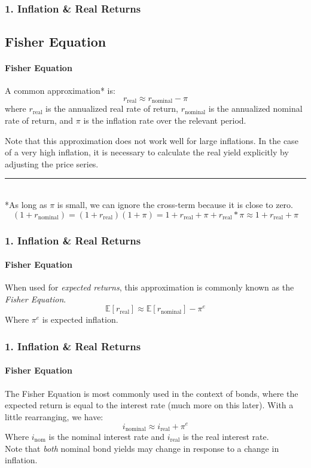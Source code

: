 \documentclass{beamer}
\begin{document}
\begin{frame}[t]
    \frametitle{1. Inflation \& Real Returns}
    \subsection{Fisher Equation}
    \framesubtitle{Fisher Equation}
    A common approximation* is:
    $$r_\text{real} \approx r_{\text{nominal}} - \pi$$
    where $r_\text{real}$ is the annualized real rate of return, 
    $r_{\text{nominal}}$ is the annualized nominal rate of return, 
    and $\pi$ is the inflation rate over the relevant period.\\
    \vspace{1em}

    Note that this approximation does not work well for large inflations.   In the case of a very high inflation, it is necessary to calculate the real yield explicitly by adjusting the price series.
    
    \vfill
    \footnotesize
    \rule{2in}{0.4pt}\\
    *As long as $\pi$ is small, we can ignore the cross-term because it is close to zero.
    $$(1 + r_{\text{nominal}}) = (1+r_\text{real})(1 + \pi) = 1 + r_\text{real} + \pi + r_\text{real}*\pi \approx 1 + r_\text{real} + \pi$$
    

\end{frame}

\begin{frame}[t]
    \frametitle{1. Inflation \& Real Returns}
    \framesubtitle{Fisher Equation}

    When used for \textit{expected returns}, this approximation is commonly known as the \textit{Fisher Equation}.\\
    $$\mathbb{E}[r_\text{real}] \approx \mathbb{E}[r_{\text{nominal}}] - \pi^e$$
    Where $\pi^e$ is expected inflation.\\
    \vspace{1em}

\end{frame}

\begin{frame}[t]
    \frametitle{1. Inflation \& Real Returns}
    \framesubtitle{Fisher Equation}

    The Fisher Equation is most commonly used in the context of bonds, where the expected return is equal to the interest rate (much more on this later).  With a little rearranging, we have:
    $$i_{\text{nominal}} \approx i_{\text{real}} + \pi^e$$
    Where $i_{\text{nom}}$ is the nominal interest rate and $i_{\text{real}}$ is the real interest rate. \\
    
    Note that \textit{both} nominal bond yields may change in response to a change in inflation.

\end{frame}
\end{document}
